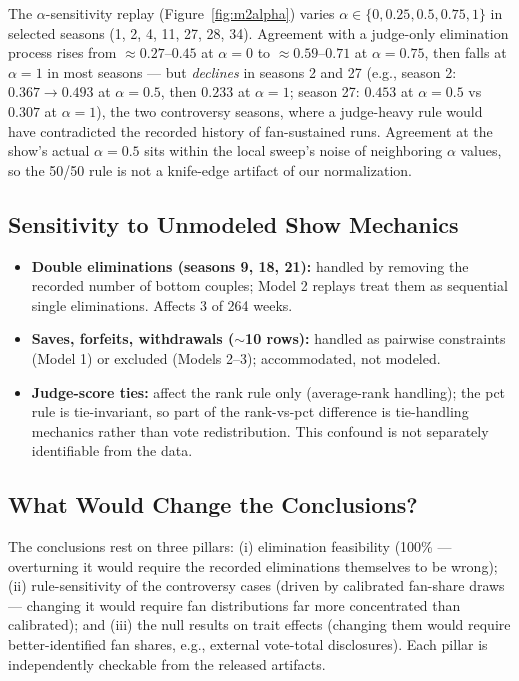 \documentclass[11pt]{article}
\begin{document}
The $\alpha$-sensitivity replay (Figure~\ref{fig:m2alpha}) varies
$\alpha \in \{0, 0.25, 0.5, 0.75, 1\}$ in selected seasons (1, 2, 4, 11, 27, 28, 34).
Agreement with a judge-only elimination process rises from $\approx 0.27$--$0.45$ at
$\alpha = 0$ to $\approx 0.59$--$0.71$ at $\alpha = 0.75$, then falls at $\alpha = 1$
in most seasons --- but \emph{declines} in seasons 2 and 27 (e.g., season 2:
$0.367 \to 0.493$ at $\alpha = 0.5$, then $0.233$ at $\alpha = 1$; season 27:
$0.453$ at $\alpha = 0.5$ vs $0.307$ at $\alpha = 1$), the two controversy seasons,
where a judge-heavy rule would have contradicted the recorded history of fan-sustained
runs. Agreement at the show's actual $\alpha = 0.5$ sits within the local sweep's noise
of neighboring $\alpha$ values, so the 50/50 rule is not a knife-edge artifact of our
normalization.

\subsection{Sensitivity to Unmodeled Show Mechanics}

\begin{itemize}[itemsep=1pt]
  \item \textbf{Double eliminations (seasons 9, 18, 21):} handled by removing the
        recorded number of bottom couples; Model 2 replays treat them as sequential
        single eliminations. Affects 3 of 264 weeks.
  \item \textbf{Saves, forfeits, withdrawals ($\sim$10 rows):} handled as pairwise
        constraints (Model 1) or excluded (Models 2--3); accommodated, not modeled.
  \item \textbf{Judge-score ties:} affect the rank rule only (average-rank handling);
        the pct rule is tie-invariant, so part of the rank-vs-pct difference is
        tie-handling mechanics rather than vote redistribution. This confound is not
        separately identifiable from the data.
\end{itemize}

\subsection{What Would Change the Conclusions?}

The conclusions rest on three pillars: (i) elimination feasibility (100\% ---
overturning it would require the recorded eliminations themselves to be wrong);
(ii) rule-sensitivity of the controversy cases (driven by calibrated fan-share draws
--- changing it would require fan distributions far more concentrated than calibrated);
and (iii) the null results on trait effects (changing them would require
better-identified fan shares, e.g., external vote-total disclosures). Each pillar is
independently checkable from the released artifacts.
\end{document}
